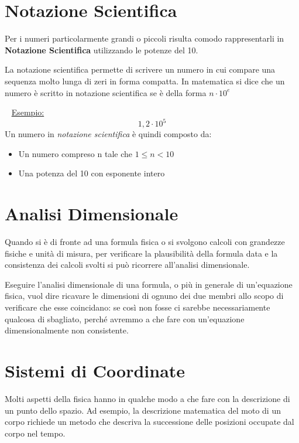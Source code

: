\documentclass[12pt,oneside]{book}
\begin{document}
\section{Notazione Scientifica}
Per i numeri particolarmente grandi o piccoli risulta comodo rappresentarli
in \textbf{Notazione Scientifica} utilizzando le potenze del 10.

La notazione scientifica permette di scrivere un numero in cui compare una sequenza molto lunga di zeri in forma compatta.
In matematica si dice che un numero è scritto in notazione scientifica se è della forma $n\cdot10^e$

~\newline
\underline{Esempio:}
\begin{equation*}
    1,2 \cdot 10^5
\end{equation*}
Un numero in \emph{notazione scientifica} è quindi composto da:
\begin{itemize}
    \item Un numero compreso n tale che $1 \leq n < 10$
    \item Una potenza del 10 con esponente intero
\end{itemize}

\newpage
\section{Analisi Dimensionale}
Quando si è di fronte ad una formula fisica o si svolgono calcoli con grandezze fisiche e unità di misura,
per verificare la plausibilità della formula data e la consistenza
dei calcoli svolti si può ricorrere all'analisi dimensionale.

Eseguire l'analisi dimensionale di una formula, o più in generale di un'equazione fisica,
vuol dire ricavare le dimensioni di ognuno dei due membri allo scopo di verificare che esse coincidano:
se così non fosse ci sarebbe necessariamente qualcosa di sbagliato, perché avremmo a che fare con un'equazione
dimensionalmente non consistente.


\section{Sistemi di Coordinate}
Molti aspetti della fisica hanno in qualche modo a che fare con la descrizione di un punto dello spazio.
Ad esempio, la descrizione matematica del moto di un corpo richiede un metodo che descriva la successione
delle posizioni occupate dal corpo nel tempo.
\end{document}
